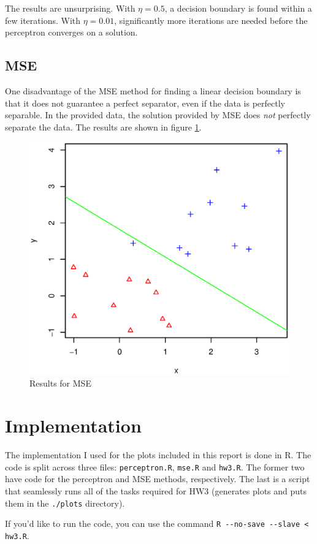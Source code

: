 \documentclass{article}
\begin{document}
The results are unsurprising. With $\eta=0.5$, a decision boundary is found
within a few iterations. With $\eta=0.01$, significantly more iterations are
needed before the perceptron converges on a solution. 

\subsection{MSE}

One disadvantage of the MSE method for finding a linear decision boundary is
that it does not guarantee a perfect separator, even if the data is perfectly
separable. In the provided data, the solution provided by MSE does {\it not}
perfectly separate the data. The results are shown in figure \ref{plot:mse}.

\begin{figure}[htb]
	\centering
	\includegraphics[width=6.5in]{plots/mse.eps}
	\caption{Results for MSE}
	\label{plot:mse}
\end{figure}

\section{Implementation}

The implementation I used for the plots included in this report is done in R.
The code is split across three files: \verb|perceptron.R|, \verb|mse.R| and
\verb|hw3.R|. The former two have code for the perceptron and MSE methods,
respectively. The last is a script that seamlessly runs all of the tasks
required for HW3 (generates plots and puts them in the \verb|./plots|
directory).

If you'd like to run the code, you can use the command 
\verb|R --no-save --slave < hw3.R|.
\end{document}
